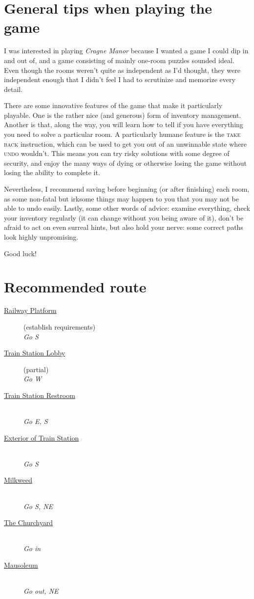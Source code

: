 \documentclass[a5paper]{extarticle}
\begin{document}
\newpage
\section{General tips when playing the game}

I was interested in playing \emph{Cragne Manor} because I wanted a game I could dip in and out of,
and a game consisting of mainly one-room puzzles sounded ideal.
Even though the rooms weren't quite as independent as I'd thought,
they were independent enough that I didn't feel I had to scrutinize and memorize every detail.

There are some innovative features of the game that make it particularly playable.
One is the rather nice (and generous) form of inventory management.
Another is that, along the way, you will learn how to tell if you have everything you need to solve a particular room.
A particularly humane feature is the \textsc{take back} instruction,
which can be used to get you out of an unwinnable state where \textsc{undo} wouldn't.
This means you can try risky solutions with some degree of security,
and enjoy the many ways of dying or otherwise losing the game
without losing the ability to complete it.

Nevertheless, I recommend saving before beginning (or after finishing) each room,
as some non-fatal but irksome things may happen to you that you may not be able to undo easily.
Lastly, some other words of advice: examine everything, check your inventory regularly
(it can change without you being aware of it), don't be afraid to act on even surreal hints,
but also hold your nerve: some correct paths look highly unpromising.

Good luck!

\newpage
\section{Recommended route}\label{sec:route}

\begin{description}
\item[{\hyperref[sec:req-Railway-Platform-0]{Railway Platform}}] (establish requirements)\\
  \emph{Go S}
\item[{\hyperref[sec:req-Train-Station-Lobby-0]{Train Station Lobby}}] (partial)\\
  \emph{Go W}
\item[{\hyperref[sec:req-Train-Station-Restroom]{Train Station Restroom}}] ~\\
  \emph{Go E, S}
\item[{\hyperref[sec:req-Exterior-of-Train-Station]{Exterior of Train Station}}] ~\\
  \emph{Go S}
\item[{\hyperref[sec:req-Milkweed]{Milkweed}}] ~\\
  \emph{Go S, NE}
\item[{\hyperref[sec:req-Churchyard]{The Churchyard}}] ~\\
  \emph{Go in}
\item[{\hyperref[sec:req-Mausoleum]{Mausoleum}}] ~\\
  \emph{Go out, NE}
\end{description}
\end{document}
